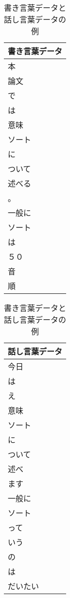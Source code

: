 \begin{table}[t]
  \begin{center}
    \leavevmode
    \caption{書き言葉データと話し言葉データの例}
    \label{tab:write_talk_juman}
\begin{tabular}{|l|}\hline
\multicolumn{1}{|c|}{書き言葉データ}\\\hline
本\\
論文\\
で\\
は\\
意味\\
ソート\\
に\\
ついて\\
述べる\\
。\\
一般に\\
ソート\\
は\\
５０\\
音\\
順\\
\hline
\end{tabular}
\hspace{.5cm}
\begin{tabular}{|l|}\hline
\multicolumn{1}{|c|}{話し言葉データ}\\\hline
今日\\
は\\
え\\
意味\\
ソート\\
に\\
ついて\\
述べ\\
ます\\
一般に\\
ソート\\
って\\
いう\\
の\\
は\\
だいたい\\\hline
\end{tabular}
\end{center}
\end{table}


